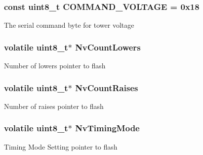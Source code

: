 \subsubsection[{C\+O\+M\+M\+A\+N\+D\+\_\+\+V\+O\+L\+T\+A\+G\+E}]{\setlength{\rightskip}{0pt plus 5cm}const uint8\+\_\+t C\+O\+M\+M\+A\+N\+D\+\_\+\+V\+O\+L\+T\+A\+G\+E = 0x18}\label{group__main__module_ga793f5eac55477efb909e878b3021f765}
The serial command byte for tower voltage \hypertarget{group__main__module_ga5f7c64789a946f4a8d7c20e94b875f30}{}
\subsubsection[{Nv\+Count\+Lowers}]{\setlength{\rightskip}{0pt plus 5cm}volatile uint8\+\_\+t$\ast$ Nv\+Count\+Lowers}\label{group__main__module_ga5f7c64789a946f4a8d7c20e94b875f30}
Number of lowers pointer to flash \hypertarget{group__main__module_ga515a64111062904ebde3d38b51d1d7d2}{}
\subsubsection[{Nv\+Count\+Raises}]{\setlength{\rightskip}{0pt plus 5cm}volatile uint8\+\_\+t$\ast$ Nv\+Count\+Raises}\label{group__main__module_ga515a64111062904ebde3d38b51d1d7d2}
Number of raises pointer to flash \hypertarget{group__main__module_ga56dcc37aec297d091908aa8c6c90a89e}{}
\subsubsection[{Nv\+Timing\+Mode}]{\setlength{\rightskip}{0pt plus 5cm}volatile uint8\+\_\+t$\ast$ Nv\+Timing\+Mode}\label{group__main__module_ga56dcc37aec297d091908aa8c6c90a89e}
Timing Mode Setting pointer to flash 